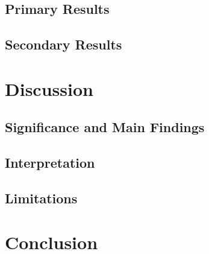 \documentclass[a4paper,10pt]{article}
\begin{document}
\subsection{Primary Results}

\subsection{Secondary Results}

\section{Discussion}

\subsection{Significance and Main Findings}

\subsection{Interpretation}

\subsection{Limitations}

\section{Conclusion}



\end{document}
